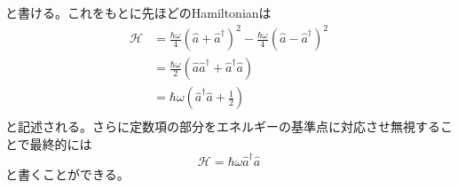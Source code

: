         と書ける。これをもとに先ほどのHamiltonianは
        \begin{equation}
        \begin{split}
            \mathcal{H}&=\frac{\hbar\omega}{4}(\hat{a}+\hat{a}^\dagger)^2-\frac{\hbar\omega}{4}(\hat{a}-\hat{a}^\dagger)^2\\
            &=\frac{\hbar\omega}{2}(\hat{a}\hat{a}^\dagger+\hat{a}^\dagger\hat{a})\\
            &=\hbar\omega(\hat{a}^\dagger\hat{a}+\frac{1}{2})\\
        \end{split}
        \end{equation}
        と記述される。さらに定数項の部分をエネルギーの基準点に対応させ無視することで最終的には
        \begin{equation}
            \mathcal{H}=\hbar\omega\hat{a}^\dagger\hat{a}
        \end{equation}
        と書くことができる。
